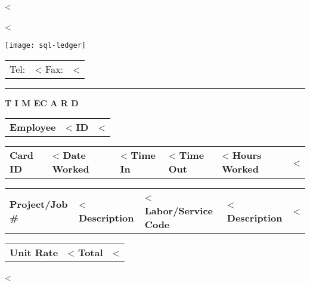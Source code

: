 \documentclass{scrartcl}
\begin{document}
\pagestyle{myheadings}
\thispagestyle{empty}

\fontsize{10pt}{12pt}\selectfont

\vspace*{-1.3cm}

\parbox{\textwidth}{%
  \parbox[b]{.42\textwidth}{%
    <%
   
    <%
  }
  \parbox[b]{.2\textwidth}{
    \texttt{[image: sql-ledger]}
  }\hfill
  \begin{tabular}[b]{rr@{}}
  Tel: & <%
  Fax: & <%
  \end{tabular}

  \rule[1.5em]{\textwidth}{0.5pt}
}

\centerline{\textbf{T I M E}\hspace{0.5cm}\textbf{C A R D}}

\vspace*{0.5cm}

\begin{tabular}[t]{ll}
  \textbf{Employee} & <%
  \textbf{ID} & <%
\end{tabular}
\hfill
\begin{tabular}[t]{ll}
  \textbf{Card ID} & <%
  \textbf{Date Worked} & <%
  \textbf{Time In} & <%
  \textbf{Time Out} & <%
  \textbf{Hours Worked} & <%
\end{tabular}

\vspace{1cm}

\begin{tabular}[b]{ll}
  \textbf{Project/Job \#} & <%
  \textbf{Description} & <%
  \textbf{Labor/Service Code} & <%
  \textbf{Description} & <%
\end{tabular}
\hfill
\begin{tabular}[b]{lr}
  \textbf{Unit Rate} & <%
  \textbf{Total} & <%
\end{tabular}
  
\vspace{0.3cm}

<%
 
\end{document}
